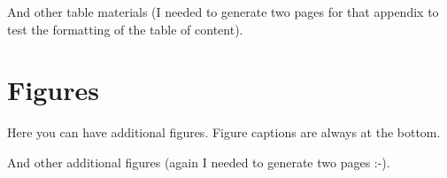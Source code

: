 \documentclass[msc,oneside]{ubcthesis}%
\begin{document}
\begin{appendices}
\newpage
And other table materials (I needed to generate two pages for that appendix to test the formatting of the table of content).

\begin{table}
\caption{Another table}
\end{table}

\begin{table}
\caption{Another table}
\end{table}
\begin{table}
\caption{Another table}
\end{table}
\begin{table}
\caption{Another table}
\end{table}
\begin{table}
\caption{Another table}
\end{table}

\begin{table}
\caption{Another table}
\end{table}
\begin{table}
\caption{Another table}
\end{table}
\begin{table}
\caption{Another table}
\end{table}
\begin{table}
\caption{Another table}
\end{table}
\begin{table}
\caption{Another table}
\end{table}

\chapter{Figures}
Here you can have additional figures. Figure captions are always at the bottom.

\newpage

And other additional figures (again I needed to generate two pages :-).

\end{appendices}
\end{document}
